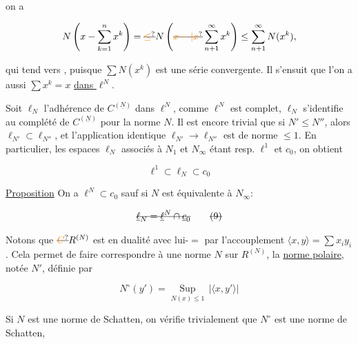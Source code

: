 on a

\[
N\left(x-\sum_{k=1}^n x^k\right)=\deleted{\unsure{\leq}}N\left(\deleted{\unsure{x-|x}}\sum_{n+1}^\infty x^k\right)\leq\sum_{n+1}^{\infty}N(x^k),
\]

qui tend vers , puisque $\sum N(x^k)$ est une série convergente. Il s'ensuit que l'on a aussi $\sum x^k=x$ \uline{dans $\ell^N$}.

Soit $\ell_N$ l'adhérence de $C^{(\underline N)}$ dans $\ell^N$, comme $\ell^N$ est complet, $\ell_N$ s'identifie au complété de $C^{(\underline N)}$ pour la norme $N$. Il est encore trivial que si $N'\leq N''$, alors $\ell_{N'}\subset\ell_{N''}$, et l'application identique $\ell_{N'}\to\ell_{N''}$ est de norme $\leq 1$. En particulier, les espaces $\ell_N$ associés à $N_1$ et $N_\infty$ étant resp. $\ell^1$ et $c_0$, on obtient

\[
\ell^1\subset\ell_N\subset c_0\tag*{(8)}
\]

\uline{Proposition} On a $\ell^N\subset c_0$ sauf si $N$ est équivalente à $N_\infty$:


\[
\deleted{\underline{\ell}_N=\underline{\ell}^N\cap\underline{c}_0}\tag*{\deleted{(9)}}
\]


Notons que $\deleted{\unsure{C}}R^{(N)}$ est en dualité avec lui-$=$ par l'accouplement $\langle x,y\rangle=\sum x_i y_i$. Cela permet de faire correspondre à  une norme $N$ sur $R^{(N)}$, la \uline{norme polaire}, notée $N'$, définie par

\[
N^\circ(y')=\underset{N(x)\leq 1}{\operatorname{Sup}}\,|\langle x,y'\rangle|\tag*{(9)}
\]


Si $N$ est une norme de Schatten, on vérifie trivialement que $N^\circ$ est une norme de Schatten,    

